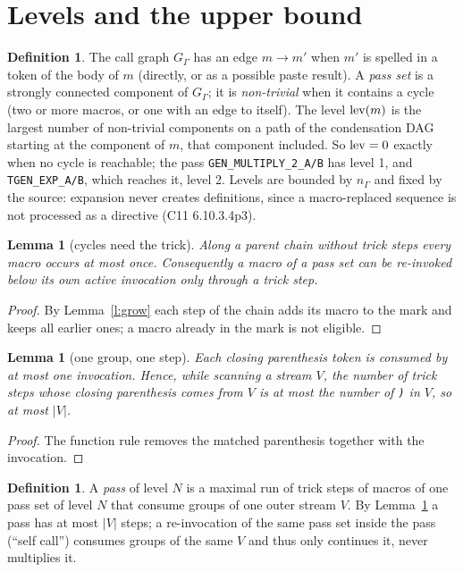 \documentclass[10pt]{article}
\newtheorem{lemma}[theorem]{Lemma}
\theoremstyle{definition}
\newtheorem{definition}[theorem]{Definition}
\theoremstyle{remark}
\newcommand{\tok}[1]{\texttt{#1}}
\begin{document}
\section{Levels and the upper bound}
\begin{definition}
The call graph $G_\Gamma$ has an edge $m\to m'$ when $m'$ is spelled in a token of the body of $m$ (directly, or as a
possible paste result). A \emph{pass set} is a strongly connected component of $G_\Gamma$; it is \emph{non-trivial}
when it contains a cycle (two or more macros, or one with an edge to itself). The level $\operatorname{lev}(m)$ is the largest number
of non-trivial components on a path of the condensation DAG starting at the component of $m$, that component included.
So $\operatorname{lev}=0$ exactly when no cycle is reachable; the pass \tok{GEN\_MULTIPLY\_2\_A/B} has level 1, and \tok{TGEN\_EXP\_A/B},
which reaches it, level 2. Levels are bounded by $n_\Gamma$ and fixed by the source: expansion never creates definitions, since a
macro-replaced sequence is not processed as a directive (C11 6.10.3.4p3).
\end{definition}

\begin{lemma}[cycles need the trick]\label{l:cyc}
Along a parent chain without trick steps every macro occurs at most once. Consequently a macro of a pass set can be
re-invoked below its own active invocation only through a trick step.
\end{lemma}
\begin{proof}
By Lemma~\ref{l:grow} each step of the chain adds its macro to the mark and keeps all earlier ones; a macro already in the
mark is not eligible.
\end{proof}

\begin{lemma}[one group, one step]\label{l:once}
Each closing parenthesis token is consumed by at most one invocation. Hence, while scanning a stream $V$, the number of
trick steps whose closing parenthesis comes from $V$ is at most the number of \tok{)} in $V$, so at most $|V|$.
\end{lemma}
\begin{proof}
The function rule removes the matched parenthesis together with the invocation.
\end{proof}

\begin{definition}
A \emph{pass} of level $N$ is a maximal run of trick steps of macros of one pass set of level $N$ that consume groups of
one outer stream $V$. By Lemma~\ref{l:once} a pass has at most $|V|$ steps; a re-invocation of the same pass set inside
the pass (``self call'') consumes groups of the same $V$ and thus only continues it, never multiplies it.
\end{definition}
\end{document}
